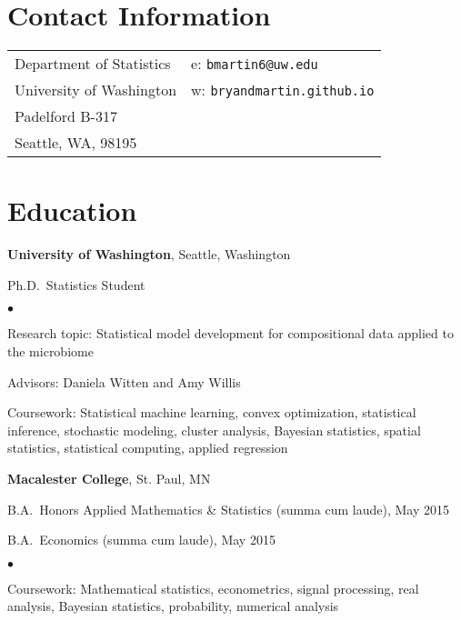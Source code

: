 \documentclass[margin,centered]{res}
\newenvironment{list1}{
  \begin{list}{\ding{113}}{%
      \setlength{\itemsep}{0in}
      \setlength{\parsep}{0in} \setlength{\parskip}{0in}
      \setlength{\topsep}{0in} \setlength{\partopsep}{0in}
      \setlength{\leftmargin}{0.17in}}}{\end{list}}
\newenvironment{list2}{
  \begin{list}{$\bullet$}{%
      \setlength{\itemsep}{0in}
      \setlength{\parsep}{0in} \setlength{\parskip}{0in}
      \setlength{\topsep}{0in} \setlength{\partopsep}{0in}
      \setlength{\leftmargin}{0.2in}}}{\end{list}}
\begin{document}
\vspace*{.1in}


\begin{resume}

\section{\sc Contact Information}

\vspace{.05in}
\begin{tabular}{@{}p{2.0in}p{2.5in}}
Department of Statistics& e:  \texttt{bmartin6@uw.edu} \\
University of Washington  &w: \texttt{bryandmartin.github.io}
\\
Padelford B-317		                   	   \\
Seattle, WA, 98195             & \\






\end{tabular}

\section{\sc Education}
{\bf University of Washington}, Seattle, Washington
\begin{list1}
\item[] 
Ph.D.~Statistics Student
\begin{list2}
\vspace*{.05in}
\item Research topic: Statistical model development for compositional data applied to the microbiome
\item Advisors: Daniela Witten and Amy Willis
\item Coursework: Statistical machine learning, convex optimization, statistical inference, stochastic modeling, cluster analysis, Bayesian statistics, spatial statistics, statistical computing, applied regression
\end{list2}
\end{list1}



{\bf Macalester College}, St. Paul, MN
\begin{list1}
\item[] B.A.~Honors Applied Mathematics \& Statistics (summa cum laude), May 2015
\item[] B.A.~Economics (summa cum laude), May 2015
\begin{list2}
\vspace*{.05in}
\item Coursework: Mathematical statistics, econometrics, signal processing, real analysis, Bayesian statistics, probability, numerical analysis
\end{list2}
\end{list1}



\end{resume}
\end{document}
